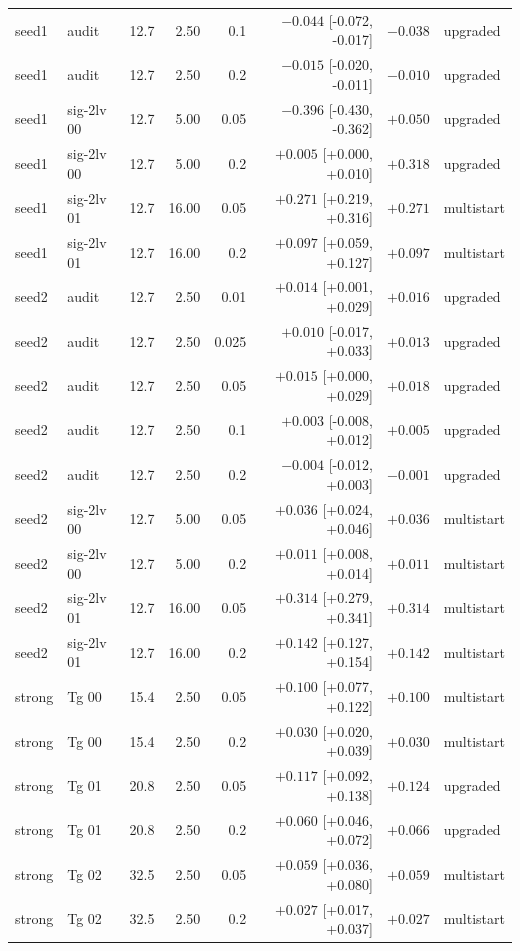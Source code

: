 \begin{longtable}{@{}llrrrrrl@{}}
seed1 & audit & 12.7 & 2.50 & 0.1 & $-0.044$ [-0.072, -0.017] & $-0.038$ & upgraded\\
seed1 & audit & 12.7 & 2.50 & 0.2 & $-0.015$ [-0.020, -0.011] & $-0.010$ & upgraded\\
seed1 & sig-2lv 00 & 12.7 & 5.00 & 0.05 & $-0.396$ [-0.430, -0.362] & $+0.050$ & upgraded\\
seed1 & sig-2lv 00 & 12.7 & 5.00 & 0.2 & $+0.005$ [+0.000, +0.010] & $+0.318$ & upgraded\\
seed1 & sig-2lv 01 & 12.7 & 16.00 & 0.05 & $+0.271$ [+0.219, +0.316] & $+0.271$ & multistart\\
seed1 & sig-2lv 01 & 12.7 & 16.00 & 0.2 & $+0.097$ [+0.059, +0.127] & $+0.097$ & multistart\\
seed2 & audit & 12.7 & 2.50 & 0.01 & $+0.014$ [+0.001, +0.029] & $+0.016$ & upgraded\\
seed2 & audit & 12.7 & 2.50 & 0.025 & $+0.010$ [-0.017, +0.033] & $+0.013$ & upgraded\\
seed2 & audit & 12.7 & 2.50 & 0.05 & $+0.015$ [+0.000, +0.029] & $+0.018$ & upgraded\\
seed2 & audit & 12.7 & 2.50 & 0.1 & $+0.003$ [-0.008, +0.012] & $+0.005$ & upgraded\\
seed2 & audit & 12.7 & 2.50 & 0.2 & $-0.004$ [-0.012, +0.003] & $-0.001$ & upgraded\\
seed2 & sig-2lv 00 & 12.7 & 5.00 & 0.05 & $+0.036$ [+0.024, +0.046] & $+0.036$ & multistart\\
seed2 & sig-2lv 00 & 12.7 & 5.00 & 0.2 & $+0.011$ [+0.008, +0.014] & $+0.011$ & multistart\\
seed2 & sig-2lv 01 & 12.7 & 16.00 & 0.05 & $+0.314$ [+0.279, +0.341] & $+0.314$ & multistart\\
seed2 & sig-2lv 01 & 12.7 & 16.00 & 0.2 & $+0.142$ [+0.127, +0.154] & $+0.142$ & multistart\\
strong & Tg 00 & 15.4 & 2.50 & 0.05 & $+0.100$ [+0.077, +0.122] & $+0.100$ & multistart\\
strong & Tg 00 & 15.4 & 2.50 & 0.2 & $+0.030$ [+0.020, +0.039] & $+0.030$ & multistart\\
strong & Tg 01 & 20.8 & 2.50 & 0.05 & $+0.117$ [+0.092, +0.138] & $+0.124$ & upgraded\\
strong & Tg 01 & 20.8 & 2.50 & 0.2 & $+0.060$ [+0.046, +0.072] & $+0.066$ & upgraded\\
strong & Tg 02 & 32.5 & 2.50 & 0.05 & $+0.059$ [+0.036, +0.080] & $+0.059$ & multistart\\
strong & Tg 02 & 32.5 & 2.50 & 0.2 & $+0.027$ [+0.017, +0.037] & $+0.027$ & multistart\\

\end{longtable}
